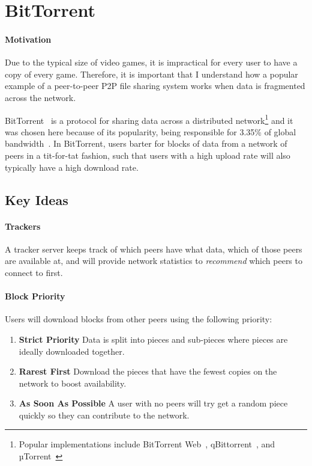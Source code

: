 
\section{BitTorrent}\label{sec:bittorrent}

\paragraph*{Motivation}
Due to the typical size of video games, it is impractical for every user to have a copy of every game. Therefore, it is important that I understand how a popular example of a peer-to-peer P2P file sharing system works when data is fragmented across the network.

\newparagraph
BitTorrent~\cite{kaune_unraveling_2010, pouwelse_bittorrent_2005} is a protocol for sharing data across a distributed network\footnote{Popular implementations include BitTorrent Web~\cite{inc_bittorrent_nodate}, qBittorrent~\cite{noauthor_qbittorrent_nodate}, and µTorrent~\cite{inc_torrent_nodate}} and 
it was chosen here because of its popularity, being responsible for 3.35\% of global bandwidth~\cite{noauthor_application_nodate}. 
In BitTorrent, users barter for blocks of data from a network of peers in a tit-for-tat fashion, such that users with a high upload rate will also typically have a high download rate.

\subsection*{Key Ideas}

\paragraph*{Trackers}
A tracker server keeps track of which peers have what data, which of those peers are available at, and will provide network statistics to \textit{recommend} which peers to connect to first.

\paragraph*{Block Priority}
Users will download blocks from other peers using the following priority:
\begin{enumerate}
  \item \textbf{Strict Priority} Data is split into pieces and sub-pieces where pieces are ideally downloaded together.
  \item \textbf{Rarest First} Download the pieces that have the fewest copies on the network to boost availability.
  \item \textbf{As Soon As Possible} A user with no peers will try get a random piece quickly so they can contribute to the network. 
\end{enumerate}

